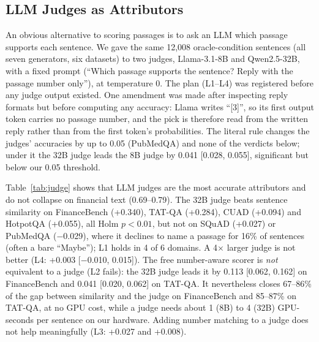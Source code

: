 \documentclass[conference]{IEEEtran}
\begin{document}
\subsection{LLM Judges as Attributors}
\label{sec:judge}
An obvious alternative to scoring passages is to ask an LLM which passage supports each sentence. We gave the same 12,008 oracle-condition sentences
(all seven generators, six datasets) to two judges, Llama-3.1-8B and Qwen2.5-32B, with a fixed prompt (``Which passage supports the sentence?
Reply with the passage number only''), at temperature 0. The plan (L1--L4) was registered before any judge output existed. One amendment was made
after inspecting reply formats but before computing any accuracy: Llama writes ``[3]'', so its first output token carries no passage number, and the
pick is therefore read from the written reply rather than from the first token's probabilities. The literal rule changes the judges' accuracies by
up to 0.05 (PubMedQA) and none of the verdicts below; under it the 32B judge leads the 8B judge by 0.041 [0.028, 0.055], significant but below our
0.05 threshold.

Table~\ref{tab:judge} shows that LLM judges are the most accurate attributors and do not collapse on financial text (0.69--0.79). The 32B judge beats
sentence similarity on FinanceBench (+0.340), TAT-QA (+0.284), CUAD (+0.094) and HotpotQA (+0.055), all Holm $p<0.01$, but not on SQuAD (+0.027) or
PubMedQA ($-$0.029), where it declines to name a passage for 16\% of sentences (often a bare ``Maybe''); L1 holds in 4 of 6 domains. A 4$\times$
larger judge is not better (L4: +0.003 [$-$0.010, 0.015]). The free number-aware scorer is \emph{not} equivalent to a judge (L2 fails): the 32B judge
leads it by 0.113 [0.062, 0.162] on FinanceBench and 0.041 [0.020, 0.062] on TAT-QA. It nevertheless closes 67--86\% of the gap between similarity
and the judge on FinanceBench and 85--87\% on TAT-QA, at no GPU cost, while a judge needs about 1 (8B) to 4 (32B) GPU-seconds per sentence on our
hardware. Adding number matching to a judge does not help meaningfully (L3: +0.027 and +0.008).
\end{document}
